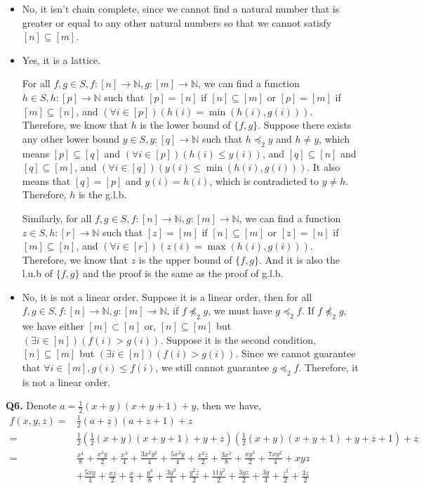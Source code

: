\documentclass{article}[12pt]
\begin{document}
\begin{enumerate}[(i)]
\begin{itemize}
\begin{enumerate}
\end{enumerate}
\item No, it isn't chain complete, since we cannot find a natural number that is greater or equal to any other natural numbers so that we cannot satisfy $[n]\subseteq [m]$.
\item Yes, it is a lattice.\par 
For all $f,g\in S,f:[n]\rightarrow \mathbb{N},g:[m]\rightarrow \mathbb{N}$, we can find a function $h\in S,h:[p]\rightarrow \mathbb{N}$ such that $[p] =[n] $ if $[n]\subseteq [m]$ or $[p] =[m] $ if $[m]\subseteq [n]$, and $(\forall i \in[p])(h(i) = \min(h(i),g(i)))$. Therefore, we know that $h$ is the lower bound of $\{f,g\}$. Suppose there exists any other lower bound $y\in S,y:[q]\rightarrow \mathbb{N}$ such that $h\preceq_2 y$ and $h\not=y$, which means $[p] \subseteq[q]$ and $(\forall i \in[p])(h(i) \leq y(i))$, and $[q] \subseteq [n] $ and $[q] \subseteq [m] $, and $(\forall i \in[q])(y(i) \leq \min(h(i),g(i)))$. It also means that $[q]=[p]$ and $y(i)=h(i)$, which is contradicted to $y\not=h$. Therefore, $h$ is the g.l.b. \par 
Similarly, for all $f,g\in S,f:[n]\rightarrow \mathbb{N},g:[m]\rightarrow \mathbb{N}$, we can find a function $z\in S,h:[r]\rightarrow \mathbb{N}$ such that $[z] =[m] $ if $[n]\subseteq [m]$ or $[z] =[n] $ if $[m]\subseteq [n]$, and $(\forall i \in[r])(z(i) = \max(h(i),g(i)))$. Therefore, we know that $z$ is the upper bound of $\{f,g\}$. And it is also the l.u.b of $\{f,g\}$ and the proof is the same as the proof of g.l.b. 
\item No, it is not a linear order. Suppose it is a linear order, then for all $f,g\in S, f:[n]\rightarrow \mathbb{N},g:[m]\rightarrow \mathbb{N}$, if $f\not\preceq_2 g$, we must have $g\preceq_2 f$. If $f\not\preceq_2 g$, we have either $[m]\subset [n]$ or, $[n] \subseteq[m]$ but $(\exists i \in[n])(f(i) > g(i))$. Suppose it is the second condition, $[n] \subseteq[m]$ but $(\exists i \in[n])(f(i) > g(i))$. Since we cannot guarantee that $\forall i\in [m],g(i)\leq f(i)$, we still cannot guarantee $g\preceq_2 f$. Therefore, it is not a linear order.
\end{itemize}
\end{enumerate}


\noindent \textbf{Q6.}
Denote $a=\frac{1}{2}(x+y)(x+y+1)+y$, then we have,
\begin{align*}
f(x,y,z)=&\frac{1}{2}(a+z)(a+z+1)+z\\
=&\frac{1}{2}(\frac{1}{2}(x+y)(x+y+1)+y+z)(\frac{1}{2}(x+y)(x+y+1)+y+z+1)+z\\
=&\frac{x^4}{8}+\frac{x^3y}{2}+\frac{x^3}{4}+\frac{3x^2y^2}{4}+\frac{5x^2y}{4}+\frac{x^2z}{2}+\frac{3x^2}{8}+\frac{xy^3}{2}+\frac{7xy^2}{4}+xyz\\
&+\frac{5xy}{4}+\frac{xz}{2}+\frac{x}{4}+\frac{y^4}{8}
+\frac{3y^3}{4}+\frac{y^2z}{2}+\frac{11y^2}{2}+\frac{3yz}{2}+\frac{3y}{4}+\frac{z^2}{2}+\frac{3z}{2}
\end{align*}
\end{document}
